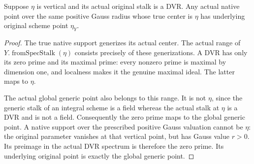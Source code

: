 \begin{lemma}
\label{lem:gauss-common-vertical-dvr-center-generic-support}
\leanok
Suppose $\eta$ is vertical and its actual original stalk is a DVR.
Any actual native point over the same positive Gauss radius whose true
center is $\eta$ has underlying original scheme point $\eta_Y$.
\end{lemma}
\begin{proof}
The true native support generizes its actual center. The actual range
of $Y.\operatorname{fromSpecStalk}(\eta)$ consists precisely of these
generizations. A DVR has only its zero prime and its maximal prime:
every nonzero prime is maximal by dimension one, and localness makes
it the genuine maximal ideal. The latter maps to $\eta$.

The actual global generic point also belongs to this range. It is not
$\eta$, since the generic stalk of an integral scheme is a field whereas
the actual stalk at $\eta$ is a DVR and is not a field. Consequently
the zero prime maps to the global generic point. A native support over
the prescribed positive Gauss valuation cannot be $\eta$: the original
parameter vanishes at that vertical point, but has Gauss value $r>0$.
Its preimage in the actual DVR spectrum is therefore the zero prime.
Its underlying original point is exactly the global generic point.
\end{proof}

